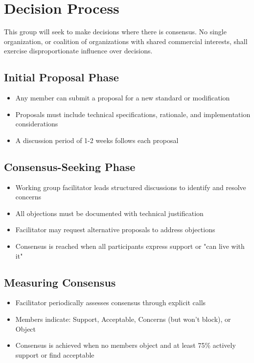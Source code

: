 \documentclass[title=small,preset=opensansnote,par=skip]{article}
\begin{document}
\section{Decision Process}
\label{sec:orge508c4f}

This group will seek to make decisions where there is consensus. No single organization, or coalition of organizations with shared commercial interests, shall exercise disproportionate influence over decisions.
\subsection{Initial Proposal Phase}
\label{sec:org37e73ca}

\begin{itemize}
\item Any member can submit a proposal for a new standard or modification
\item Proposals must include technical specifications, rationale, and implementation considerations
\item A discussion period of 1-2 weeks follows each proposal
\end{itemize}
\subsection{Consensus-Seeking Phase}
\label{sec:org183ad9e}

\begin{itemize}
\item Working group facilitator leads structured discussions to identify and resolve concerns
\item All objections must be documented with technical justification
\item Facilitator may request alternative proposals to address objections
\item Consensus is reached when all participants express support or "can live with it"
\end{itemize}
\subsection{Measuring Consensus}
\label{sec:org57a35e8}

\begin{itemize}
\item Facilitator periodically assesses consensus through explicit calls
\item Members indicate: Support, Acceptable, Concerns (but won't block), or Object
\item Consensus is achieved when no members object and at least 75\% actively support or find acceptable
\end{itemize}
\end{document}
